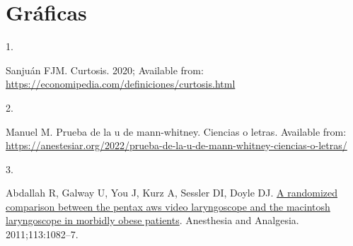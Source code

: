 \documentclass[
]{article}
\newenvironment{Shaded}{\begin{snugshade}}{\end{snugshade}}
\newcommand{\FunctionTok}[1]{\textcolor[rgb]{0.13,0.29,0.53}{\textbf{#1}}}
\newcommand{\NormalTok}[1]{#1}
\newcommand{\OtherTok}[1]{\textcolor[rgb]{0.56,0.35,0.01}{#1}}
\newcommand{\SpecialCharTok}[1]{\textcolor[rgb]{0.81,0.36,0.00}{\textbf{#1}}}
\newcommand{\StringTok}[1]{\textcolor[rgb]{0.31,0.60,0.02}{#1}}
\newlength{\cslhangindent}
\newlength{\csllabelwidth}
\newlength{\cslentryspacingunit} %
\newenvironment{CSLReferences}[2] %
 {%
  \setlength{\parindent}{0pt}
  \ifodd #1
  \let\oldpar\par
  \def\par{\hangindent=\cslhangindent\oldpar}
  \fi
  \setlength{\parskip}{#2\cslentryspacingunit}
 }%
 {}
\newcommand{\CSLLeftMargin}[1]{\parbox[t]{\csllabelwidth}{#1}}
\newcommand{\CSLRightInline}[1]{\parbox[t]{\linewidth - \csllabelwidth}{#1}\break}
\begin{document}
\begin{Shaded}
\end{Shaded}

\hypertarget{gruxe1ficas}{%
\section*{Gráficas}\label{gruxe1ficas}}

\hypertarget{refs}{}
\begin{CSLReferences}{0}{0}
\leavevmode{}%
\CSLLeftMargin{1. }%
\CSLRightInline{Sanjuán FJM. Curtosis. 2020; Available from:
\url{https://economipedia.com/definiciones/curtosis.html}}

\leavevmode{}%
\CSLLeftMargin{2. }%
\CSLRightInline{Manuel M. Prueba de la u de mann-whitney. Ciencias o
letras. Available from:
\url{https://anestesiar.org/2022/prueba-de-la-u-de-mann-whitney-ciencias-o-letras/}}

\leavevmode{}%
\CSLLeftMargin{3. }%
\CSLRightInline{Abdallah R, Galway U, You J, Kurz A, Sessler DI, Doyle
DJ. \href{https://doi.org/10.1213/ANE.0b013e31822cf47d}{A randomized
comparison between the pentax aws video laryngoscope and the macintosh
laryngoscope in morbidly obese patients}. Anesthesia and Analgesia.
2011;113:1082--7. }

\end{CSLReferences}
\end{document}
